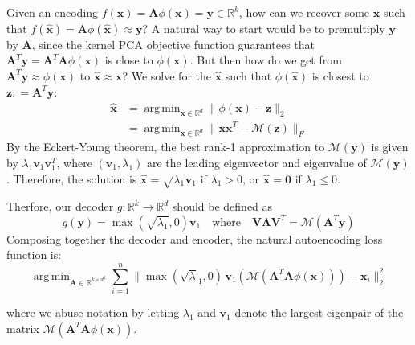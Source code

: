 \documentclass[]{article}
\newcommand{\reals}{\mathbb{R}}
\DeclareMathOperator*{\argmin}{arg\,min}
\begin{document}
Given an encoding $f(\mathbf{x}) = \mathbf{A} \phi(\mathbf{x}) = \mathbf{y} \in \reals^k$, how can we recover some $\hat{\mathbf{x}}$ such that $f(\hat{\mathbf{x}}) = \mathbf{A} \phi(\hat{\mathbf{x}}) \approx \mathbf{y}$?
A natural way to start would be to premultiply $\mathbf{y}$ by $\mathbf{A}$, since the kernel PCA objective function guarantees that $\mathbf{A}^T \mathbf{y} = \mathbf{A}^T \mathbf{A} \phi(\mathbf{x})$ is close to $\phi(\mathbf{x})$.
But then how do we get from $\mathbf{A}^T \mathbf{y} \approx \phi(\mathbf{x})$ to $\hat{\mathbf{x}} \approx \mathbf{x}$?
We solve for the $\hat{\mathbf{x}}$ such that $\phi(\hat{\mathbf{x}})$ is closest to $\mathbf{z}: = \mathbf{A}^T \mathbf{y}$:
\begin{align*}
\hat{\mathbf{x}} &= \argmin_{\mathbf{x} \in \reals^d} \| \phi(\mathbf{x}) -  \mathbf{z}\|_2 \\
&=  \argmin_{\mathbf{x} \in \reals^d} \| \mathbf{x} \mathbf{x}^T -  \mathcal{M}(\mathbf{z})\|_F 
\end{align*}
By the Eckert-Young theorem, the best rank-1 approximation to $\mathcal{M}(\mathbf{y})$ is given by $\lambda_1 \mathbf{v}_1 \mathbf{v}_1^T$, where $(\mathbf{v}_1, \lambda_1)$ are the leading eigenvector and eigenvalue of $\mathcal{M}(\mathbf{y})$.
Therefore, the solution is $\hat{\mathbf{x}} = \sqrt{\lambda_1} \mathbf{v}_1$ if $\lambda_1  > 0$, or $\hat{\mathbf{x}} = \mathbf{0}$ if $\lambda_1 \le 0$.

Therfore, our decoder $g: \reals^{k} \to \reals^d$ should be defined as
$$ g(\mathbf{y}) = \max(\sqrt{\lambda_1}, 0) \mathbf{v}_1 \quad \text{where} \quad \mathbf{V} \boldsymbol{\Lambda} \mathbf{V}^T = \mathcal{M}(\mathbf{A}^T \mathbf{y})$$ 
Composing together the decoder and encoder, the natural autoencoding loss function is:
$$ \argmin_{\mathbf{A} \in \reals^{k \times d^2}} \sum_{i=1}^n \| \max(\sqrt\lambda_1, 0) \, \mathbf{v}_1(\mathcal{M}(\mathbf{A}^T \mathbf{A} \phi(\mathbf{x}))) - \mathbf{x}_i \|^2_2 $$

where we abuse notation by letting $\lambda_1$ and $\mathbf{v}_1$ denote the largest eigenpair of the matrix $\mathcal{M}(\mathbf{A}^T \mathbf{A} \phi(\mathbf{x}))$.
\end{document}

